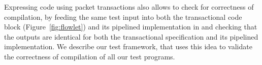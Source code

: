 Expressing code using packet transactions also allows to check for correctness
of compilation, by feeding the same test input into both the transactional code
block (Figure~\ref{fig:flowlet}) and its pipelined implementation in
\absmachine and checking that the outputs are identical for both the
transactional specification and its pipelined implementation. We describe our
test framework, \tester that uses this idea to validate the correctness of
compilation of all our test programs.



